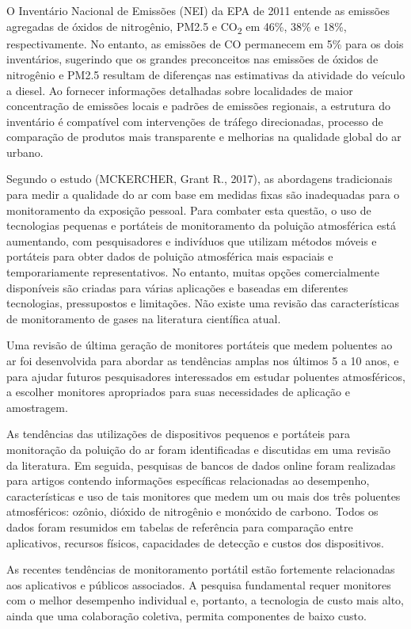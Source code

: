 O Inventário Nacional de Emissões (NEI) da EPA de 2011 entende as emissões agregadas de óxidos de 
nitrogênio, PM2.5 e CO\textsubscript{2} em 46\%, 38\% e 18\%, respectivamente. No entanto, as 
emissões de CO permanecem em 5\% para os dois inventários, sugerindo que os grandes preconceitos nas 
emissões de óxidos de nitrogênio e PM2.5 resultam de diferenças nas estimativas da atividade do 
veículo a diesel. Ao fornecer informações detalhadas sobre localidades de maior concentração de 
emissões locais e padrões de emissões regionais, a estrutura do inventário é compatível com 
intervenções de tráfego direcionadas, processo de comparação de produtos mais transparente e 
melhorias na qualidade global do ar urbano.

Segundo o estudo (MCKERCHER, Grant R., 2017), as abordagens tradicionais para medir a qualidade do ar 
com base em medidas fixas são inadequadas para o monitoramento da exposição pessoal. Para combater 
esta questão, o uso de tecnologias pequenas e portáteis de monitoramento da poluição atmosférica está 
aumentando, com pesquisadores e indivíduos que utilizam métodos móveis e portáteis para obter dados 
de poluição atmosférica mais espaciais e temporariamente representativos. No entanto, muitas opções 
comercialmente disponíveis são criadas para várias aplicações e baseadas em diferentes tecnologias, 
pressupostos e limitações. Não existe uma revisão das características de monitoramento de gases na 
literatura científica atual.

Uma revisão de última geração de monitores portáteis que medem poluentes ao ar foi desenvolvida para 
abordar as tendências amplas nos últimos 5 a 10 anos, e para ajudar futuros pesquisadores 
interessados em estudar poluentes atmosféricos, a escolher monitores apropriados para suas 
necessidades de aplicação e amostragem.

As tendências das utilizações de dispositivos pequenos e portáteis para monitoração da poluição do ar 
foram identificadas e discutidas em uma revisão da literatura. Em seguida, pesquisas de bancos de 
dados online foram realizadas para artigos contendo informações específicas relacionadas ao 
desempenho, características e uso de tais monitores que medem um ou mais dos três poluentes 
atmosféricos: ozônio, dióxido de nitrogênio e monóxido de carbono. Todos os dados foram resumidos em 
tabelas de referência para comparação entre aplicativos, recursos físicos, capacidades de detecção e 
custos dos dispositivos.

As recentes tendências de monitoramento portátil estão fortemente relacionadas aos aplicativos e 
públicos associados. A pesquisa fundamental requer monitores com o melhor desempenho individual e, 
portanto, a tecnologia de custo mais alto, ainda que uma colaboração coletiva, permita componentes 
de baixo custo.

